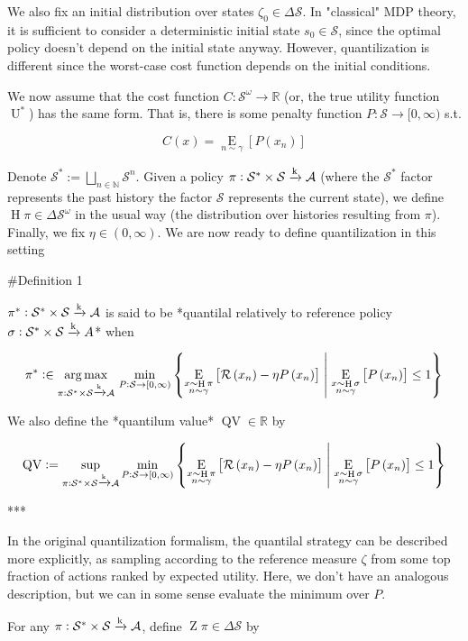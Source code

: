 \documentclass[a4paper]{article}
\newcommand{\AP}[1]{\left(#1\right)}
\newcommand{\AB}[1]{\left[#1\right]}
\newcommand{\ACM}[2]{\left\{#1\;\middle\vert\;#2\right\}}
\newcommand{\Ea}[2]{\underset{#1}{\operatorname{E}}\AB{#2}}
\newcommand{\Argmax}[1]{\underset{#1}{\operatorname{arg\,max}}\,}
\newcommand{\Nats}{\mathbb{N}}
\newcommand{\Reals}{\mathbb{R}}
\newcommand{\K}{\xrightarrow{\textnormal{k}}}
\newcommand{\A}{\mathcal{A}}
\newcommand{\St}{\mathcal{S}}
\newcommand{\R}{\mathcal{R}}
\newcommand{\Pe}{P}
\newcommand{\Ut}{\operatorname{U}}
\newcommand{\Co}{C}
\newcommand{\QV}{\operatorname{QV}}
\DeclareMathOperator{\Hi}{H}
\DeclareMathOperator{\Z}{Z}
\begin{document}
We also fix an initial distribution over states $\zeta_0 \in \Delta \St$. In "classical" MDP theory, it is sufficient to consider a deterministic initial state $s_0 \in \St$, since the optimal policy doesn't depend on the initial state anyway. However, quantilization is different since the worst-case cost function depends on the initial conditions.

We now assume that the cost function $\Co: \St^\omega \rightarrow \Reals$ (or, the true utility function $\Ut^*$) has the same form. That is, there is some penalty function $\Pe: \St \rightarrow [0,\infty)$ s.t.

$$\Co(x) = \Ea{n\sim\gamma}{\Pe\AP{x_n}}$$

Denote $\St^*:=\bigsqcup_{n\in\Nats}\St^n$. Given a policy $\pi: \St^*\times\St \K \A$ (where the $\St^*$ factor represents the past history the factor $\St$ represents the current state), we define $\Hi{\pi} \in \Delta\St^\omega$ in the usual way (the distribution over histories resulting from $\pi$). Finally, we fix $\eta \in (0,\infty)$. We are now ready to define quantilization in this setting

\#Definition 1

$\pi^* : \St^*\times\St \K \A$ is said to be *quantilal relatively to reference policy $\sigma: \St^*\times\St \K A$* when

$$\pi^* :\in \Argmax{\pi: \St^*\times\St \K \A}\min_{\Pe:\St\rightarrow[0,\infty)}\ACM{\Ea{\substack{x\sim\Hi{\pi}\\n\sim\gamma}}{\R\AP{x_n}-\eta\Pe\AP{x_n}}}{\Ea{\substack{x\sim\Hi{\sigma}\\n\sim\gamma}}{\Pe\AP{x_n}}\leq1}$$

We also define the *quantilum value* $\QV \in \Reals$ by

$$\QV := \sup_{\pi: \St^*\times\St \K \A}\min_{\Pe:\St\rightarrow[0,\infty)}\ACM{\Ea{\substack{x\sim\Hi{\pi}\\n\sim\gamma}}{\R\AP{x_n}-\eta\Pe\AP{x_n}}}{\Ea{\substack{x\sim\Hi{\sigma}\\n\sim\gamma}}{\Pe\AP{x_n}}\leq1}$$

***

In the original quantilization formalism, the quantilal strategy can be described more explicitly, as sampling according to the reference measure $\zeta$ from some top fraction of actions ranked by expected utility. Here, we don't have an analogous description, but we can in some sense evaluate the minimum over $\Pe$.

For any $\pi: \St^*\times\St \K \A$, define $\Z{\pi}\in\Delta\St$ by
\end{document}
